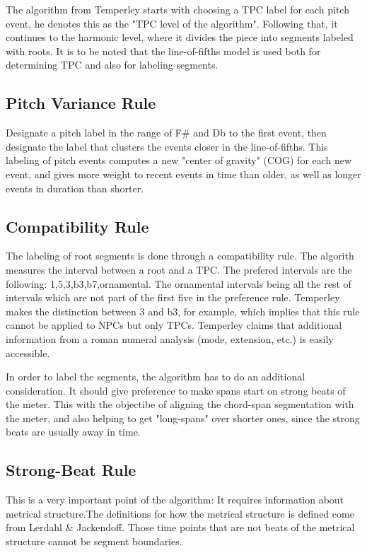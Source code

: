 \begin{itemize}
    The algorithm from Temperley starts with choosing a TPC label for each pitch event, he denotes this as the "TPC level of the algorithm". Following that, it continues to the harmonic level, where it divides the piece into segments labeled with roots. It is to be noted that the line-of-fifths model is used both for determining TPC and also for labeling segments.
  \end{itemize}

  \subsection{Pitch Variance Rule}
  Designate a pitch label in the range of F\# and Db to the first event, then designate the label that clusters the events closer in the line-of-fifths. This labeling of pitch events computes a new "center of gravity" (COG) for each new event, and gives more weight to recent events in time than older, as well as longer events in duration than shorter.

  \subsection{Compatibility Rule}
  The labeling of root segments is done through a compatibility rule. The algorith measures the interval between a root and a TPC. The prefered intervals are the following: 1,5,3,b3,b7,ornamental. The ornamental intervals being all the rest of intervals which are not part of the first five in the preference rule. Temperley makes the distinction between 3 and b3, for example, which implies that this rule cannot be applied to NPCs but only TPCs. Temperley claims that additional information from a roman numeral analysis (mode, extension, etc.) is easily accessible.

  In order to label the segments, the algorithm has to do an additional consideration. It should give preference to make spans start on strong beats of the meter. This with the objectibe of aligning the chord-span segmentation with the meter, and also helping to get "long-spans" over shorter ones, since the strong beats are usually away in time.

  \subsection{Strong-Beat Rule}
  This is a very important point of the algorithm: It requires information about metrical structure.The definitions for how the metrical structure is defined come from Lerdahl \& Jackendoff. Those time points that are not beats of the metrical structure cannot be segment boundaries.

